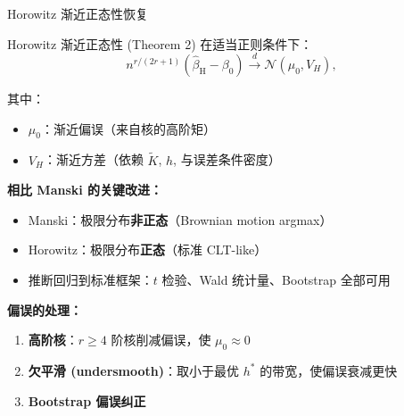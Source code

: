 \documentclass[aspectratio=169, 10pt]{beamer}
\begin{document}
\begin{frame}[shrink=10]{Horowitz 渐近正态性恢复}

  \begin{definitionbox}{{Horowitz 渐近正态性 (Theorem 2)}}
    在适当正则条件下：
    $$n^{r/(2r+1)}(\hat\beta_{\text{H}} - \beta_0) \overset{d}{\to}
    \mathcal{N}(\mu_0, V_H),$$

    其中：
    \begin{itemize}\setlength{\itemsep}{1pt}
      \item $\mu_0$：渐近偏误（来自核的高阶矩）
      \item $V_H$：渐近方差（依赖 $\tilde K$, $h$, 与误差条件密度）
    \end{itemize}
  \end{definitionbox}

  \begin{highlightbox}
    \textbf{相比 Manski 的关键改进：}
    \begin{itemize}\setlength{\itemsep}{1pt}
      \item Manski：极限分布\textbf{非正态}（Brownian motion argmax）
      \item Horowitz：极限分布\textbf{正态}（标准 CLT-like）
      \item 推断回归到标准框架：$t$ 检验、Wald 统计量、Bootstrap 全部可用
    \end{itemize}
  \end{highlightbox}

  \begin{keybox}
    \textbf{偏误的处理：}
    \begin{enumerate}\setlength{\itemsep}{1pt}
      \item \textbf{高阶核}：$r \geq 4$ 阶核削减偏误，使 $\mu_0 \approx 0$
      \item \textbf{欠平滑 (undersmooth)}：取小于最优 $h^{*}$ 的带宽，使偏误衰减更快
      \item \textbf{Bootstrap 偏误纠正}
    \end{enumerate}
  \end{keybox}

  \hypertarget{main-c16}{}
  \hfill{\scriptsize\hyperlink{proof-c16}{}}

\end{frame}
\end{document}
